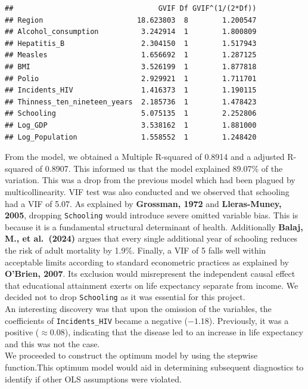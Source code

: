 \documentclass[
  10pt,
]{article}
\begin{document}
\begin{verbatim}
##                                  GVIF Df GVIF^(1/(2*Df))
## Region                      18.623803  8        1.200547
## Alcohol_consumption          3.242914  1        1.800809
## Hepatitis_B                  2.304150  1        1.517943
## Measles                      1.656692  1        1.287125
## BMI                          3.526199  1        1.877818
## Polio                        2.929921  1        1.711701
## Incidents_HIV                1.416373  1        1.190115
## Thinness_ten_nineteen_years  2.185736  1        1.478423
## Schooling                    5.075135  1        2.252806
## Log_GDP                      3.538162  1        1.881000
## Log_Population               1.558552  1        1.248420
\end{verbatim}

From the model, we obtained a Multiple R-squared of 0.8914 and a
adjusted R-squared of 0.8907. This informed us that the model explained
89.07\% of the variation. This was a drop from the previous model which
had been plagued by multicollinearity. VIF test was also conducted and
we observed that schooling had a VIF of 5.07. As explained by
\textbf{Grossman, 1972} and \textbf{Lleras-Muney, 2005}, dropping
\texttt{Schooling} would introduce severe omitted variable bias. This is
because it is a fundamental structural determinant of health.
Additionally \textbf{Balaj, M., et al.~(2024)} argues that every single
additional year of schooling reduces the risk of adult mortality by
1.9\%. Finally, a VIF of 5 falls well within acceptable limits according
to standard econometric practices as explained by \textbf{O'Brien,
2007}. Its exclusion would misrepresent the independent causal effect
that educational attainment exerts on life expectancy separate from
income. We decided not to drop \texttt{Schooling} as it was essential
for this project.\\

An interesting discovery was that upon the omission of the variables,
the coefficients of \texttt{Incidents\_HIV} became a negative
(\(-1.18\)). Previously, it was a positive (\(\approx 0.08\)),
indicating that the disease led to an increase in life expectancy and
this was not the case.\\

We proceeded to construct the optimum model by using the stepwise
function.This optimum model would aid in determining subsequent
diagnostics to identify if other OLS assumptions were violated.\\
\end{document}
